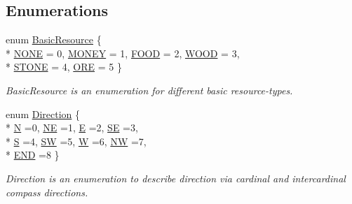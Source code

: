 \subsection*{Enumerations}
\begin{DoxyCompactItemize}
\item 
enum \hyperlink{namespaceCourse_a02d49c04029594d4adba79b84bb85f65}{Basic\-Resource} \{ \\*
\hyperlink{namespaceCourse_a02d49c04029594d4adba79b84bb85f65ae3def61eb1a9033cc0b0d1d2c3c6ff84}{N\-O\-N\-E} = 0, 
\hyperlink{namespaceCourse_a02d49c04029594d4adba79b84bb85f65aff016add6bbbdbb44abf1d2d7f215ec0}{M\-O\-N\-E\-Y} = 1, 
\hyperlink{namespaceCourse_a02d49c04029594d4adba79b84bb85f65a7018c47af38bfc1390a89e70b4cf4760}{F\-O\-O\-D} = 2, 
\hyperlink{namespaceCourse_a02d49c04029594d4adba79b84bb85f65a87287be3009253b983ffb2e9f91eef22}{W\-O\-O\-D} = 3, 
\\*
\hyperlink{namespaceCourse_a02d49c04029594d4adba79b84bb85f65a8598c3079c2be7785410e724cc190229}{S\-T\-O\-N\-E} = 4, 
\hyperlink{namespaceCourse_a02d49c04029594d4adba79b84bb85f65af416a215c7dad21349df38d35be0a1e1}{O\-R\-E} = 5
 \}
\begin{DoxyCompactList}\small\item\em Basic\-Resource is an enumeration for different basic resource-\/types. \end{DoxyCompactList}\item 
enum \hyperlink{namespaceCourse_aad6b2bd7587f1ac9c29b6693cc653931}{Direction} \{ \\*
\hyperlink{namespaceCourse_aad6b2bd7587f1ac9c29b6693cc653931af5dce52f20ddecf6403835b49381f7a9}{N} =0, 
\hyperlink{namespaceCourse_aad6b2bd7587f1ac9c29b6693cc653931aa2c0da6c1941a1033bcb95497c644a8f}{N\-E} =1, 
\hyperlink{namespaceCourse_aad6b2bd7587f1ac9c29b6693cc653931ae88f699aa3a0aa63888128cc083778ec}{E} =2, 
\hyperlink{namespaceCourse_aad6b2bd7587f1ac9c29b6693cc653931a399366e0aafffec2a92abbba13473f0a}{S\-E} =3, 
\\*
\hyperlink{namespaceCourse_aad6b2bd7587f1ac9c29b6693cc653931aced61892e630ea7b63642f0b1384464d}{S} =4, 
\hyperlink{namespaceCourse_aad6b2bd7587f1ac9c29b6693cc653931a056d251a73952134308cb9c5e9ada5a7}{S\-W} =5, 
\hyperlink{namespaceCourse_aad6b2bd7587f1ac9c29b6693cc653931a5506046be3be53a5a3a1f03c73666b21}{W} =6, 
\hyperlink{namespaceCourse_aad6b2bd7587f1ac9c29b6693cc653931a719970b7eb3e580e47564b2295c2f8a0}{N\-W} =7, 
\\*
\hyperlink{namespaceCourse_aad6b2bd7587f1ac9c29b6693cc653931a354b8b349381722f01c14557ccac139d}{E\-N\-D} =8
 \}
\begin{DoxyCompactList}\small\item\em Direction is an enumeration to describe direction via cardinal and intercardinal compass directions. \end{DoxyCompactList}\end{DoxyCompactItemize}
